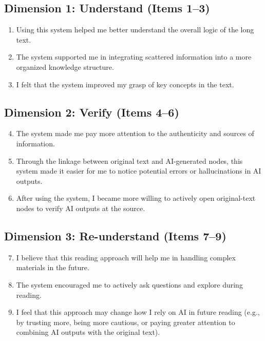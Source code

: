 \documentclass[manuscript,review,anonymous]{acmart}
\begin{document}
\subsection*{Dimension 1: Understand (Items 1--3)}
\begin{enumerate}[label=\arabic*.]
 \item Using this system helped me better understand the overall logic of the long text.
 \item The system supported me in integrating scattered information into a more organized knowledge structure.
 \item I felt that the system improved my grasp of key concepts in the text.
\end{enumerate}

\subsection*{Dimension 2: Verify (Items 4--6)}
\begin{enumerate}[label=\arabic*.]
 \setcounter{enumi}{3}
 \item The system made me pay more attention to the authenticity and sources of information.
 \item Through the linkage between original text and AI-generated nodes, this system made it easier for me to notice potential errors or hallucinations in AI outputs.
 \item After using the system, I became more willing to actively open original-text nodes to verify AI outputs at the source.
\end{enumerate}

\subsection*{Dimension 3: Re-understand (Items 7--9)}
\begin{enumerate}[label=\arabic*.]
 \setcounter{enumi}{6}
 \item I believe that this reading approach will help me in handling complex materials in the future.
 \item The system encouraged me to actively ask questions and explore during reading.
 \item I feel that this approach may change how I rely on AI in future reading (e.g., by trusting more, being more cautious, or paying greater attention to combining AI outputs with the original text).
\end{enumerate}
\end{document}
